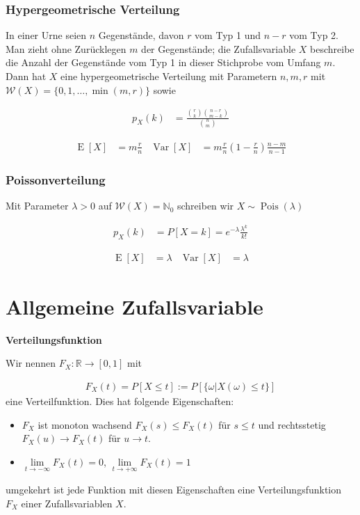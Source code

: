 \documentclass[25pt]{sciposter}
\newcommand{\R}{\mathbb{R}}
\newcommand{\N}{\mathbb{N}}
\newcommand{\W}{\mathcal{W}}
\newcommand{\Var}{\operatorname{Var}}
\newcommand{\E}{\operatorname{E}}
\newenvironment{method}[1]{\begin{mdframed}[backgroundcolor=blue!10,innertopmargin=15pt, innerbottommargin=15pt,nobreak=true]
		\textbf{#1 }
	}
	{ 
	\end{mdframed}
}
\begin{document}
\begin{multicols}{3}
		\subsubsection*{Hypergeometrische Verteilung}
		In einer Urne seien $n$ Gegenstände, davon $r$ vom Typ 1 und $n-r$ vom Typ 2. Man
		zieht ohne Zurücklegen $m$ der Gegenstände; die Zufallsvariable $X$ beschreibe die Anzahl
		der Gegenstände vom Typ 1 in dieser Stichprobe vom Umfang $m$. Dann hat $X$ eine
		hypergeometrische Verteilung mit Parametern $n,m,r$ mit $\W(X) = \{0, 1, \ldots, \min(m, r)\}$ sowie
		
		\begin{align*}
			p_X(k) &= \frac{{r\choose k} {n-r \choose m-k}}{{n \choose m}}
		\end{align*}
		
		\begin{align*}
			\E[X] &= m\frac{r}{n} & \Var[X] &= m\frac{r}{n}\left(1-\frac{r}{n}\right) \frac{n-m}{n-1}
		\end{align*}
		
		
		
		\subsubsection*{Poissonverteilung}
		
		Mit Parameter $\lambda>0$ auf $\W(X) = \N_0$ schreiben wir $X\sim {\operatorname{Pois}}(\lambda)$
		
		\begin{align*}
			p_X(k) &= P[X = k] = e^{-\lambda} \frac{\lambda^k}{k!}
		\end{align*}
		
		\begin{align*}
			\E[X] &= \lambda & \Var[X] &= \lambda
		\end{align*}
		
		
		
		
		\section{Allgemeine Zufallsvariable}
		
		
		
		\begin{method}{Verteilungsfunktion}
			Wir nennen $F_X : \R \to [0,1]$ mit 
			
			\begin{align*}
				F_X (t) = P[X\leq t]:= P[\{\omega | X(\omega) \leq t\}]
			\end{align*}
			eine Verteilfunktion. Dies hat folgende Eigenschaften:
			\begin{itemize}
				\item $F_X$ ist monoton wachsend $F_X(s)\leq F_X(t)$ für $s\leq t$ und rechtsstetig $F_X(u) \to F_X(t)$ für $u \to t$.
				\item $\lim\limits_{t\to-\infty} F_X(t) = 0$, $\lim\limits_{t\to + \infty} F_X(t) = 1$ 
			\end{itemize}
			umgekehrt ist jede Funktion mit diesen Eigenschaften eine Verteilungsfunktion $F_X$ einer Zufallsvariablen $X$.
		\end{method}
		

\end{multicols}
\end{document}
